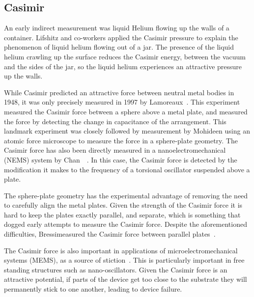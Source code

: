 \subsection{Casimir}
An early indirect measurement was liquid Helium flowing up the walls of a container.  
Lifshitz and co-workers applied the Casimir pressure to explain the phenomenon of liquid helium
flowing out of a jar.  The presence of the liquid helium crawling up the surface reduces the Casimir energy,
between the vacuum and the sides of the jar, so the liquid helium experiences an attractive pressure up the walls.  


While Casimir predicted an attractive force between neutral metal bodies in 1948,
it was only precisely measured in 1997 by Lamoreaux~\cite{Lamoreaux1997}.   
This experiment measured the Casimir force between a sphere above a metal plate,
and measured the force by detecting the change in capacitance of the arrangement.  
This landmark experiment was closely followed by measurement by Mohideen\etal\cite{Mohideen1998}
using an atomic force microscope to measure the force in a sphere-plate geometry.  
The Casimir force has also been directly measured in a nanoelectromechanical (NEMS) system 
by Chan~\etal~\cite{Chan2001}.  In this case, the Casimir force is detected by the modification it
makes to the frequency of a torsional oscillator suspended above a plate.  

The sphere-plate geometry has the experimental advantage of removing the need to carefully
align the metal plates. Given the strength of the Casimir force it is hard to keep the plates exactly parallel,
and separate, which is something that dogged early attempts to measure the Casimir force.
Despite the aforementioned difficulties, Bressi\etal measured the Casimir force between parallel plates~\cite{Bressi2002}.  


The Casimir force is also important in applications of microelectromechanical systems (MEMS), 
as a source of stiction~\cite{Tas1996, Serry1998, Buks2001}.  This is particularly important
in free standing structures such as nano-oscillators.  %
Given the Casimir force is an attractive potential, if parts of the device get too close to the substrate
they will permanently stick to one another, leading to device failure.  

